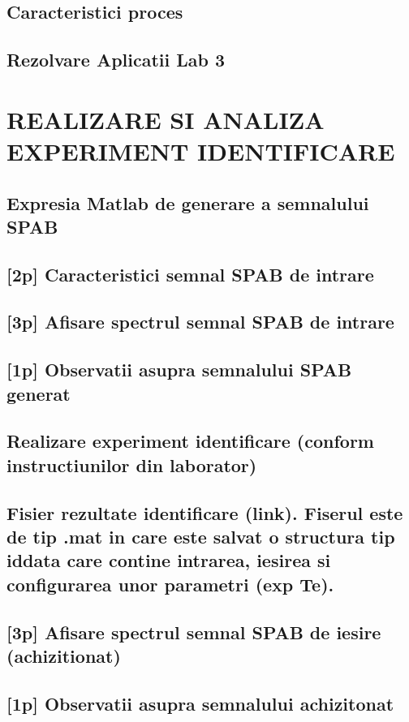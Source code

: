\documentclass[12pt,english]{article}
\begin{document}
\subsection { Caracteristici proces }
\subsection { Rezolvare Aplicatii Lab 3 }

\section { REALIZARE SI ANALIZA EXPERIMENT IDENTIFICARE }
\subsection { Expresia Matlab de generare a semnalului SPAB }
\subsection { [2p] Caracteristici semnal SPAB de intrare }
\subsection { [3p] Afisare spectrul semnal SPAB de intrare }
\subsection { [1p] Observatii asupra semnalului SPAB generat }
\subsection { Realizare experiment identificare (conform instructiunilor din laborator) }
\subsection { Fisier rezultate identificare (link). Fiserul este de tip .mat in care este salvat o structura tip iddata care contine intrarea, iesirea si configurarea unor parametri (exp Te). }
\subsection { [3p] Afisare spectrul semnal SPAB de iesire (achizitionat) }
\subsection { [1p] Observatii asupra semnalului achizitonat }
\end{document}
